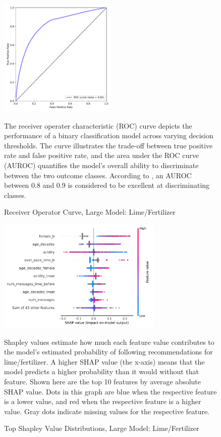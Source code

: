 \documentclass[12pt]{article}
\begin{document}
\begin{figure}[H]
    \centering
    \caption{Receiver Operator Curve, Large Model: Lime/Fertilizer}
    \includegraphics[width=0.5\textwidth]{../output/lightgbm_roc_combined.pdf}
    \begin{minipage}{0.6\textwidth}
    \tiny
    The receiver operater characteristic (ROC) curve depicts the performance of a binary classification model across varying decision thresholds. The curve illustrates the trade-off between true positive rate and false positive rate, and the area under the ROC curve (AUROC) quantifies the model's overall ability to discriminate between the two outcome classes. According to \textcite{mandrekar_receiver_2010}, an AUROC between 0.8 and 0.9 is considered to be excellent at discriminating classes.
    \end{minipage}
    \label{fig:roc_combined}
\end{figure}

\begin{figure}[H]
    \centering
    \caption{Top Shapley Value Distributions, Large Model: Lime/Fertilizer}
    \includegraphics[width=0.7\textwidth]{../output/shap_beeswarm_combined.pdf}
    \begin{minipage}{0.7\textwidth}
    \tiny
    Shapley values estimate how much each feature value contributes to the model's estimated probability of following recommendations for lime/fertilizer. A higher SHAP value (the x-axis) means that the model predicts a higher probability than it would without that feature. Shown here are the top 10 features by average absolute SHAP value. Dots in this graph are blue when the respective feature is a lower value, and red when the respective feature is a higher value. Gray dots indicate missing values for the respective feature.
    \end{minipage}
    \label{fig:shap_combined}
\end{figure}
\end{document}
